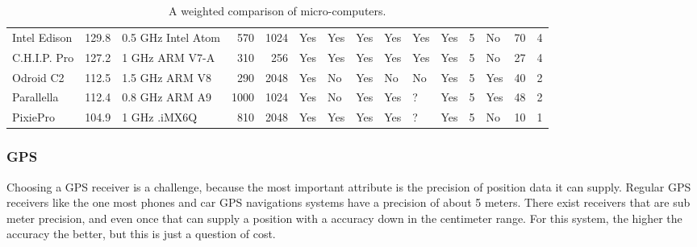 \begin{table}
{\begin{tabular}{lrlrrllllllrlrr}
    Intel Edison & \cellcolor[rgb]{ .988,  .757,  .486}129.8 & 0.5 GHz Intel Atom & 570   & 1024  & \cellcolor[rgb]{ .573,  .816,  .314}Yes & \cellcolor[rgb]{ .573,  .816,  .314}Yes & \cellcolor[rgb]{ .573,  .816,  .314}Yes & \cellcolor[rgb]{ .573,  .816,  .314}Yes & \cellcolor[rgb]{ .573,  .816,  .314}Yes & \cellcolor[rgb]{ .573,  .816,  .314}Yes & 5     & No    & 70    & 4 \\
    \rowcolor[rgb]{ .851,  .851,  .851} C.H.I.P. Pro & \cellcolor[rgb]{ .988,  .722,  .478}127.2 & 1 GHz ARM V7-A & 310   & 256   & \cellcolor[rgb]{ .573,  .816,  .314}Yes & \cellcolor[rgb]{ .573,  .816,  .314}Yes & \cellcolor[rgb]{ .573,  .816,  .314}Yes & \cellcolor[rgb]{ .573,  .816,  .314}Yes & \cellcolor[rgb]{ .573,  .816,  .314}Yes & \cellcolor[rgb]{ .573,  .816,  .314}Yes & 5     & No    & 27    & 4 \\
    Odroid C2 & \cellcolor[rgb]{ .976,  .518,  .439}112.5 & 1.5 GHz ARM V8 & 290   & 2048  & \cellcolor[rgb]{ .573,  .816,  .314}Yes & No    & \cellcolor[rgb]{ .573,  .816,  .314}Yes & No    & No    & \cellcolor[rgb]{ .573,  .816,  .314}Yes & 5     & \cellcolor[rgb]{ .573,  .816,  .314}Yes & 40    & 2 \\
    \rowcolor[rgb]{ .851,  .851,  .851} Parallella & \cellcolor[rgb]{ .976,  .514,  .439}112.4 & 0.8 GHz ARM A9 & 1000  & 1024  & \cellcolor[rgb]{ .573,  .816,  .314}Yes & No    & \cellcolor[rgb]{ .573,  .816,  .314}Yes & \cellcolor[rgb]{ .573,  .816,  .314}Yes & ?     & \cellcolor[rgb]{ .573,  .816,  .314}Yes & 5     & \cellcolor[rgb]{ .573,  .816,  .314}Yes & 48    & 2 \\
    PixiePro & \cellcolor[rgb]{ .973,  .412,  .42}104.9 & 1 GHz .iMX6Q  & 810   & 2048  & \cellcolor[rgb]{ .573,  .816,  .314}Yes & \cellcolor[rgb]{ .573,  .816,  .314}Yes & \cellcolor[rgb]{ .573,  .816,  .314}Yes & \cellcolor[rgb]{ .573,  .816,  .314}Yes & ?     & \cellcolor[rgb]{ .573,  .816,  .314}Yes & 5     & No    & 10    & 1 \\
    \bottomrule
    \end{tabular}%
    }
  \caption{A weighted comparison of micro-computers.}%
  \label{tab:board_candidates}%
\end{table}%

\subsubsection{GPS}
Choosing a GPS receiver is a challenge, because the most important attribute is the precision of position data it can supply. Regular GPS receivers like the one most phones and car GPS navigations systems have a precision of about 5 meters. There exist receivers that are sub meter precision, and even once that can supply a position with a accuracy down in the centimeter range. 
For this system, the higher the accuracy the better, but this is just a question of cost. 

